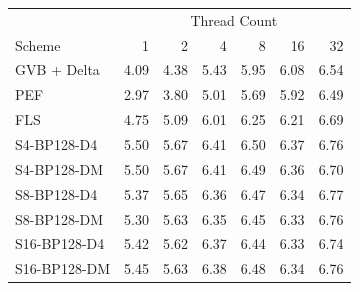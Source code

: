 \begin{tabular}{lrrrrrr}
\toprule
 & \multicolumn{6}{c}{Thread Count} \\
Scheme & 1 & 2 & 4 & 8 & 16 & 32 \\
\midrule
GVB + Delta & 4.09 & 4.38 & 5.43 & 5.95 & 6.08 & 6.54 \\
PEF & 2.97 & 3.80 & 5.01 & 5.69 & 5.92 & 6.49 \\
FLS & 4.75 & 5.09 & 6.01 & 6.25 & 6.21 & 6.69 \\
S4-BP128-D4 & 5.50 & 5.67 & 6.41 & 6.50 & 6.37 & 6.76 \\
S4-BP128-DM & 5.50 & 5.67 & 6.41 & 6.49 & 6.36 & 6.70 \\
S8-BP128-D4 & 5.37 & 5.65 & 6.36 & 6.47 & 6.34 & 6.77 \\
S8-BP128-DM & 5.30 & 5.63 & 6.35 & 6.45 & 6.33 & 6.76 \\
S16-BP128-D4 & 5.42 & 5.62 & 6.37 & 6.44 & 6.33 & 6.74 \\
S16-BP128-DM & 5.45 & 5.63 & 6.38 & 6.48 & 6.34 & 6.76 \\
\bottomrule
\end{tabular}
